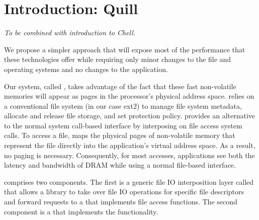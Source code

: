 \section{Introduction: Quill}
\label{sec:introduction-quill}

\begin{comment}
Emerging non-volatile memories such as spin-torque transfer, phase change, and
memristor-based memories promise to revolutionize IO performance and how
systems manage and provide access to persistent state.  The most aggressive
proposals for integrating these technologies place them on the processor's
memory bus alongside or replacing conventional DRAM.

Placing fast, non-volatile memories on the memory bus raises a host of design
issues, and several proposals examine extensive changes to the file
system~\cite{BPFS} and the basic abstractions that applications use to
manipulate non-volatile data~\cite{mnemosyne}.  These proposals provide
useful features (including transactional semantics), but they require
significant changes to hardware, the file system, and/or the applications to
leverage them.
\end{comment}

\emph{To be combined with introduction to Chell.}

We propose a simpler approach that will expose most of the
performance that these technologies offer while requiring only minor changes to
the file and operating systems and no changes to the application.

Our system, called \emph{\Muse{}}, takes advantage of the fact that these fast
non-volatile memories will appear as pages in the processor's physical address
space.  \Muse{} relies on a conventional file system (in our case ext2) to
manage file system metadata, allocate and release file storage, and set
protection policy.  \Muse{} provides an alternative to the normal system
call-based interface by interposing on file access system calls.  To access a
file, \Muse{} maps the physical pages of non-volatile memory that represent the
file directly into the application's virtual address space.  As a result, no
paging is necessary.  Consequently, for most accesses, applications see both
the latency and bandwidth of DRAM while using a normal file-based interface.

\Muse{} comprises two components.  The first is a generic file IO interposition
layer called \emph{\Switch{}} that allows a library to take over file IO
operations for specific file descriptors and forward requests to a \backend{}
that implements file access functions.  The second component is a \Switch{}
\backend{} that implements the \Muse{} functionality.

